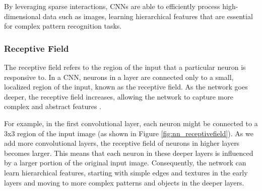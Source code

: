 \documentclass[english,11pt,a4paper,titlepage]{article}
\begin{document}
	By leveraging sparse interactions, CNNs are able to efficiently process high-dimensional data such as images, learning hierarchical features that are essential for complex pattern recognition tasks.
	
	\subsubsection*{Receptive Field}
	The receptive field refers to the region of the input that a particular neuron is responsive to. In a CNN, neurons in a layer are connected only to a small, localized region of the input, known as the receptive field. As the network goes deeper, the receptive field increases, allowing the network to capture more complex and abstract features \cite{osheaIntroductionConvolutionalNeural2015}.
	
	For example, in the first convolutional layer, each neuron might be connected to a 3x3 region of the input image (as shown in Figure \ref{fig:nn_receptivefield}). As we add more convolutional layers, the receptive field of neurons in higher layers becomes larger. This means that each neuron in these deeper layers is influenced by a larger portion of the original input image. Consequently, the network can learn hierarchical features, starting with simple edges and textures in the early layers and moving to more complex patterns and objects in the deeper layers.
	
\end{document}
